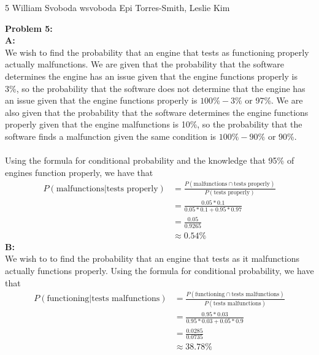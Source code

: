 \documentclass[12pt,letterpaper]{cos340hw}
\begin{document}
           {5}            %
           {William Svoboda}  %
           {wsvoboda}   %
           {Epi Torres-Smith, Leslie Kim} 




\noindent\textbf{Problem 5:}\\
\noindent\textbf{A:}\\
We wish to find the probability that an engine that tests as functioning properly actually malfunctions. We
are given that the probability that the software determines the engine has an issue given that the engine 
functions properly is 3\%, so the probability that the software does not determine that the engine has an 
issue given that the engine functions properly is $100\%-3\%$ or 97\%. We are also given that the 
probability that the software determines the engine functions properly given that the engine malfunctions 
is 10\%, so the probability that the software finds a malfunction given the same condition is $100\%-90\%$ 
or 90\%.\\\\
Using the formula for conditional probability and the knowledge that 95\% of engines function properly, we have that
\begin{align*}
P(\textrm{malfunctions}|\textrm{tests properly}) & =\frac{P(\textrm{malfunctions}\cap\textrm{tests properly})}{P(\textrm{tests properly})}\\
& = \frac{0.05*0.1}{0.05*0.1+0.95*0.97}\\
& = \frac{0.05}{0.9265}\\
& \approx0.54\%
\end{align*}
\noindent\textbf{B:}\\
We wish to to find the probability that an engine that tests as it malfunctions actually functions properly. 
Using the formula for conditional probability, we have that 
\begin{align*}
P(\textrm{functioning}|\textrm{tests malfunctions}) & =\frac{P(\textrm{functioning}\cap\textrm{tests malfunctions})}{P(\textrm{tests malfunctions})}\\
& = \frac{0.95*0.03}{0.95*0.03+0.05*0.9}\\
& = \frac{0.0285}{0.0735}\\
& \approx38.78\%
\end{align*}

\end{document}
